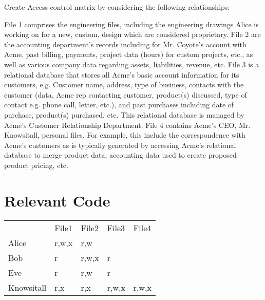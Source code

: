 \documentclass{report}
\begin{document}
Create Access control matrix by considering the following relationships:

File 1 comprises the engineering files, including the engineering
drawings Alice is working on for a new, custom, design which are
considered proprietary.  File 2 are the accounting department’s
records including for Mr. Coyote’s account with Acme, past billing,
payments, project data (hours) for custom projects, etc., as well as
various company data regarding assets, liabilities, revenue, etc.
File 3 is a relational database that stores all Acme’s basic account
information for its customers, e.g. Customer name, address, type of
business, contacts with the customer (data, Acme rep contacting
customer, product(s) discussed, type of contact e.g. phone call,
letter, etc.), and past purchases including date of purchase,
product(s) purchased, etc. This relational database is managed by
Acme’s Customer Relationship Department.  File 4 contains Acme’s CEO,
Mr. Knowsitall, personal files. For example, this include the
correspondence with Acme’s customers as is typically generated by
accessing Acme’s relational database to merge product data, accounting
data used to create proposed product pricing, etc.

\section{Relevant Code}
\label{sec:relevant-code-1}

\begin{table}[h!]
\centering
\begin{tabular}{lllll}
 & File1 & File2 & File3 & File4 \\
Alice & r,w,x & r,w &  &  \\
Bob & r & r,w,x & r &  \\
Eve & r & r,w & r &  \\
Knowsitall & r,x & r,x & r,w,x & r,w,x
\end{tabular}
\end{table}
\end{document}
